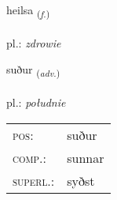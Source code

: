 \documentclass[frontgrid, backgrid]{flacards}\usepackage[]{graphicx}\usepackage[]{xcolor}
\begin{document}
\renewcommand{\flhead}{\vskip5pt \fboxsep=0pt {\small\bfseries\footnotesize Nafnorð | Noun}}
\renewcommand{\fcfoot}{\vskip5pt \fboxsep=0pt \hspace{2pt}{\small\bfseries\footnotesize 2K}}

\renewcommand{\blhead}{\vskip5pt {\small\bfseries\footnotesize Nafnorð | Noun }}
\renewcommand{\bcfoot}{\vskip5pt \hspace{2pt}{\small\bfseries\footnotesize 2K}}


{heilsa \small{\textsubscript{(\textit{f.})}} \\[1ex] %
\textphonetic{[heilsa]} \\
pl.: \emph{zdrowie} \\  [2ex]
\renewcommand*{\arraystretch}{0.8}
}

\renewcommand{\flhead}{\vskip5pt \fboxsep=0pt {\small\bfseries\footnotesize Atviksorð | Adverb}}
\renewcommand{\fcfoot}{\vskip5pt \fboxsep=0pt \hspace{2pt}{\small\bfseries\footnotesize 2K}}

\renewcommand{\blhead}{\vskip5pt {\small\bfseries\footnotesize Atviksorð | Adverb }}
\renewcommand{\bcfoot}{\vskip5pt \hspace{2pt}{\small\bfseries\footnotesize 2K}}


{suður \small{\textsubscript{(\textit{adv.})}} \\[1ex] %
\textphonetic{[sʏːðʏr]} \\
pl.: \emph{południe} \\  [2ex]
\renewcommand*{\arraystretch}{0.8}
\begin{tabular}{ll}
\textsc{pos}: & suður \\ 
\textsc{comp.}: & sunnar \\ 
\textsc{superl.}: & syðst \\
\end{tabular}
}
\end{document}
